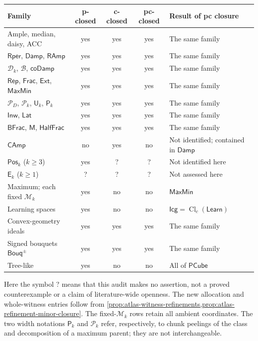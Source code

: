 \documentclass[11pt]{article}
\theoremstyle{definition}
\newcommand{\MaxMin}{\mathsf{MaxMin}}
\newcommand{\Damp}{\mathsf{Damp}}
\newcommand{\RAmp}{\mathsf{RAmp}}
\newcommand{\Rep}{\mathsf{Rep}}
\newcommand{\Frac}{\mathsf{Frac}}
\newcommand{\Rper}{\mathsf{Rper}}
\newcommand{\PCube}{\mathsf{PCube}}
\newcommand{\Cl}{\operatorname{Cl}}
\begin{document}
\begin{center}
\small
\begin{tabular}{@{}lccc>{\raggedright\arraybackslash}p{}@{}}
\toprule
Family & p-closed & c-closed & pc-closed & Result of pc closure\\
\midrule
Ample, median, daisy, ACC & yes & yes & yes & The same family\\
$\Rper$, $\Damp$, $\RAmp$ & yes & yes & yes & The same family\\
$\mathcal D_k$, $\mathcal B$, $\mathsf{coDamp}$ & yes & yes & yes & The same family\\
$\Rep$, $\Frac$, $\mathsf{Ext}$, $\MaxMin$ & yes & yes & yes & The same family\\
$\mathcal P_D$, $\mathcal P_k$, $\mathsf U_k$, $\mathsf P_k$
 & yes & yes & yes & The same family\\
$\mathsf{Inw}$, $\mathsf{Lat}$ & yes & yes & yes & The same family\\
$\mathsf{BFrac}$, $\mathsf M$, $\mathsf{HalfFrac}$
 & yes & yes & yes & The same family\\
$\mathsf{CAmp}$ & no & yes & no & Not identified; contained in $\Damp$\\
$\mathsf{Pos}_k$ ($k\ge3$) & yes & ? & ? & Not identified here\\
$\mathsf E_k$ ($k\ge1$) & ? & ? & ? & Not assessed here\\
Maximum; each fixed $\mathcal M_k$ & yes & no & no & $\MaxMin$\\
Learning spaces & yes & no & no & $\mathsf{Icg}=\Cl_c(\mathsf{Learn})$\\
Convex-geometry ideals & yes & yes & yes & The same family\\
Signed bouquets $\mathsf{Bouq}^{\pm}$ & yes & yes & yes & The same family\\
Tree-like & yes & no & no & All of $\PCube$\\
\bottomrule
\end{tabular}
\end{center}

Here the symbol \textsf{?} means that this audit makes no assertion,
not a proved counterexample or a claim of literature-wide openness.
The new allocation and whole-witness entries follow from
\cref{prop:atlas-witness-refinements,prop:atlas-refinement-minor-closure}.
The fixed-$\mathcal M_k$ rows retain all ambient coordinates.
The two width notations $\mathsf P_k$ and $\mathcal P_k$ refer,
respectively, to chunk peelings of the class and decomposition of a
maximum parent; they are not interchangeable.
\end{document}
